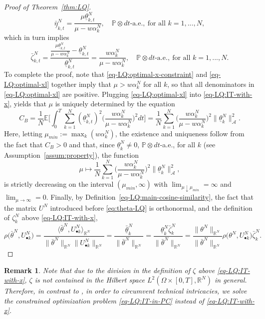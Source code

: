\documentclass[11pt]{article}
\def\al{\alpha}
\def\P{\mathbb{P}}
\def\E{{\mathbb{E}}}
\newcommand{\R}{{\mathbb R}}
\newcommand{\be}{\begin{equation}}
\newcommand{\ee}{\end{equation}}
\newtheorem{remark}[theorem]{Remark}
\numberwithin{equation}{section}
\begin{document}
\begin{proof}[Proof of Theorem~\ref{thm:LQ}]
\be\label{eq-LQ:optimal-bl}
\underline{\bar{\eta}}^N_{k,t}=\frac{\mu\underline{\theta}^N_{k,t}}{\mu-w\al^N_k},\quad \P \otimes dt \textrm{-a.e.}, \ \textrm{for all } k=1,...,N, 
\ee
which in turn implies
\be\label{eq-LQ:optimal-xl}
\bar\zeta^N_{k,t}=\frac{\frac{\mu\underline{\theta}^N_{k,t}}{\mu-w\al^N_k}-\underline{\theta}^N_{k,t}}{\underline{\theta}^N_{k,t}}=\frac{w\al^N_k}{\mu-w\al^N_k},\quad \P \otimes dt \textrm{-a.e.}, \ \textrm{for all } k=1,...,N. 
\ee 
To complete the proof, note that \eqref{eq-LQ:optimal-x-constraint} and \eqref{eq-LQ:optimal-xl} together imply that $\mu>w\al^N_k$ for all $k$, so that all denominators in \eqref{eq-LQ:optimal-xl} are positive. Plugging \eqref{eq-LQ:optimal-xl} into \eqref{eq-LQ:IT-with-x}, yields that $\mu$ is uniquely determined by the equation 
\be
C_B=\frac{1}{N}\E\bigg[\int_0^T\sum_{k=1}^N (\underline{\theta}^N_{k,t})^2\big(\frac{w\al^N_k}{\mu-w\al^N_k}\big)^2dt\bigg]=\frac{1}{N}\sum_{k=1}^N\big(\frac{w\al^N_k}{\mu-w\al^N_k}\big)^2\|\underline{\theta}^N_k\|_{\mathcal{A}}^2.
\ee
Here, letting $\mu_{min}:=\max_{k}(w\al^N_k)$, the existence and uniqueness follow from the fact that $C_B>0$ and that, since $\underline{\theta}^N_k\neq 0$, $\P \otimes dt$-a.e., for all $k$ (see Assumption~\ref{assum:property}), the function 
$$
\mu\mapsto\frac{1}{N}\sum_{k=1}^N\big(\frac{w\al^N_k}{\mu-w\al^N_k}\big)^2\|\underline{\theta}^N_k\|_{\mathcal{A}}^2,
$$
is strictly decreasing on the interval $(\mu_{min},\infty)$ with $\lim_{\mu\downarrow \mu_{min}}=\infty$ and $\lim_{\mu\to \infty}=0$. Finally, by Definition~\ref{eq-LQ:main-cosine-similarity}, the fact that the matrix $U^N$ introduced before \eqref{eq:theta-LQ} is orthonormal, and the definition of $\zeta_k^N$ above \eqref{eq-LQ:IT-with-x},
\be
\rho\big({\bar\theta^N},U^N_{\bullet k}\big)
=\frac{\langle\bar\theta^N,U^N_{\bullet k}\rangle_{\R^N}}{\|{\bar\theta^N}\|_{\R^N}\|U^N_{\bullet k}\|_{\R^N}}
=\frac{\underline{\bar\theta}^N_k}{\|{\bar\theta^N}\|_{\R^N}}
=\frac{\underline{\theta}^N_k \bar\zeta^N_k}{\|{\bar\theta^N}\|_{\R^N}}
=\frac{\|\theta^N\|_{\R^N}}{\|{\bar\theta^N}\|_{\R^N}}\rho\big(\theta^N,U^N_{\bullet k}\big)\bar\zeta^N_k.
\ee
\end{proof}
\begin{remark}
Note that due to the division in the definition of $\zeta$ above \eqref{eq-LQ:IT-with-x}, $\zeta$ is not contained in the Hilbert space $L^2(\Omega\times[0,T],\R^N)$ in general. Therefore, in contrast to \cite{galeotti2020targeting}, in order to circumvent technical intricacies, we solve the constrained optimization problem \eqref{eq-LQ:IT-in-PC} instead of \eqref{eq-LQ:IT-with-x}.
\end{remark}
\end{document}
